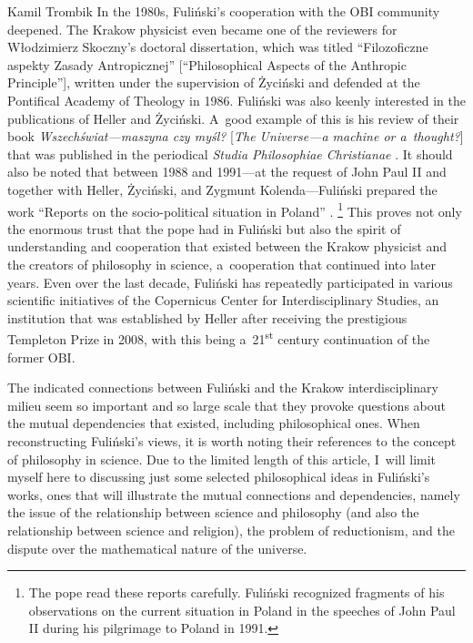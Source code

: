 \begin{artengenv}{Kamil Trombik}
In the 1980s, Fuliński's cooperation with the OBI community deepened. The Krakow physicist even became one of the reviewers for Włodzimierz Skoczny's doctoral dissertation, which was titled ``Filozoficzne aspekty Zasady Antropicznej'' [``Philosophical Aspects of the Anthropic Principle''], written under the supervision of Życiński and defended at the Pontifical Academy of Theology in 1986. Fuliński was also keenly interested in the publications of Heller and Życiński. A~good example of this is his review of their book \textit{Wszechświat---maszyna czy myśl?} [\textit{The Universe---a machine or a~thought?}] that was published in the periodical \textit{Studia Philosophiae Christianae} 
\parencite[][]{fulinski_maszyna_1989}. %
 It should also be noted that between 1988 and 1991---at the request of John Paul II and together with Heller, Życiński, and Zygmunt Kolenda---Fuliński prepared the work ``Reports on the socio-political situation in Poland'' 
\parencite[][]{heller_jan_2020}.%
\footnote{The pope read these reports carefully. Fuliński recognized fragments of his observations on the current situation in Poland in the speeches of John Paul II during his pilgrimage to Poland in 1991.} This proves not only the enormous trust that the pope had in Fuliński but also the spirit of understanding and cooperation that existed between the Krakow physicist and the creators of philosophy in science, a~cooperation that continued into later years. Even over the last decade, Fuliński has repeatedly participated in various scientific initiatives of the Copernicus Center for Interdisciplinary Studies, an institution that was established by Heller after receiving the prestigious Templeton Prize in 2008, with this being a~21\textsuperscript{st} century continuation of the former OBI.



The indicated connections between Fuliński and the Krakow interdisciplinary milieu seem so important and so large scale that they provoke questions about the mutual dependencies that existed, including philosophical ones. When reconstructing Fuliński's views, it is worth noting their references to the concept of philosophy in science. Due to the limited length of this article, I~will limit myself here to discussing just some selected philosophical ideas in Fuliński's works, ones that will illustrate the mutual connections and dependencies, namely the issue of the relationship between science and philosophy (and also the relationship between science and religion), the problem of reductionism, and the dispute over the mathematical nature of the universe.




\end{artengenv}
